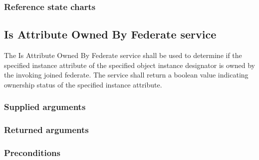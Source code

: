 \begin{compactstdpage}
    \subsubsection{Reference state charts}



    \subsection{Is Attribute Owned By Federate service}


    The Is Attribute Owned By Federate service shall be used to determine if the specified instance attribute of the specified object instance designator is owned by the invoking joined federate. The service shall return a boolean value indicating ownership status of the specified instance attribute.

    \subsubsection{Supplied arguments}



    \subsubsection{Returned arguments}



    \subsubsection{Preconditions}



\end{compactstdpage}

\clearpage

